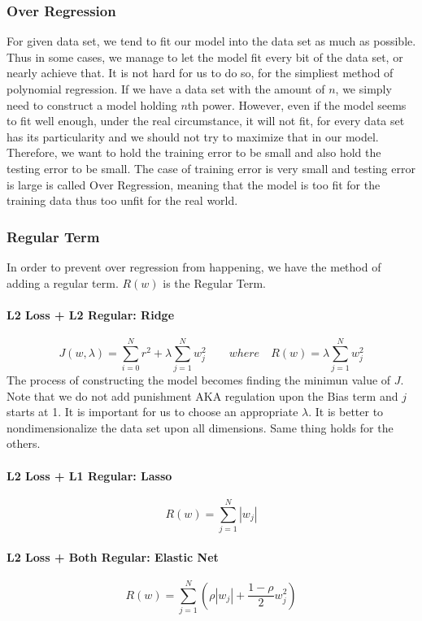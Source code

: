 \documentclass{article}
\begin{document}
	\subsubsection{Over Regression}
	For given data set, we tend to fit our model into the data set as much as possible. Thus in some cases, we manage to let the model fit every bit of the data set, or nearly achieve that. It is not hard for us to do so, for the simpliest method of polynomial regression. If we have a data set with the amount of $n$, we simply need to construct a model holding $n$th power. However, even if the model seems to fit well enough, under the real circumstance, it will not fit, for every data set has its particularity and we should not try to maximize that in our model. Therefore, we want to hold the training error to be small and also hold the testing error to be small. The case of training error is very small and testing error is large is called Over Regression, meaning that the model is too fit for the training data thus too unfit for the real world.
	\subsubsection{Regular Term}
	In order to prevent over regression from happening, we have the method of adding a regular term. $R(w)$ is the Regular Term.
	\paragraph{L2 Loss + L2 Regular: Ridge}
	\begin{displaymath}
		J(w,\lambda) = \sum_{i=0}^{N} r^2 + \lambda \sum_{j=1}^{N} w_j^2 \qquad where\quad R(w) = \lambda \sum_{j=1}^{N} w_j^2
	\end{displaymath}
	The process of constructing the model becomes finding the minimun value of $J$. Note that we do not add punishment AKA regulation upon the Bias term and $j$ starts at 1. It is important for us to choose an appropriate $\lambda$. It is better to nondimensionalize the data set upon all dimensions. Same thing holds for the others.
	\paragraph{L2 Loss + L1 Regular: Lasso}
	\begin{displaymath}
		R(w) = \sum_{j=1}^{N}|w_j|
	\end{displaymath}
	\paragraph{L2 Loss + Both Regular: Elastic Net}
	\begin{displaymath}
		R(w) = \sum_{j=1}^{N}(\rho |w_j| + \frac{1 - \rho}{2}w_j^2)
	\end{displaymath}
\end{document}
